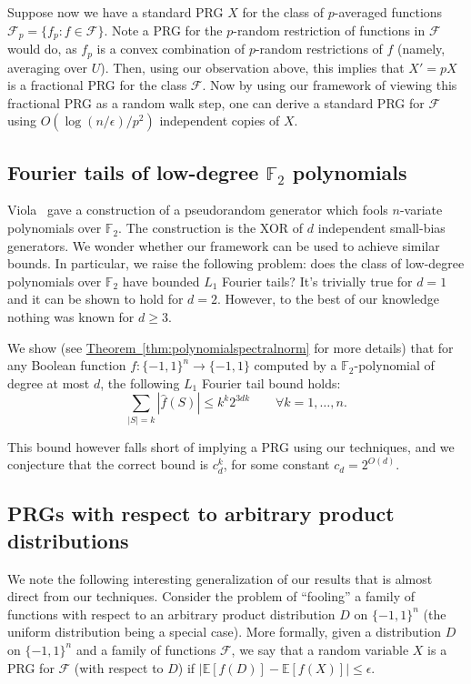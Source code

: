 \documentclass[11pt]{article}
\numberwithin{equation}{section}
\theoremstyle{definition}
\theoremstyle{plain}
\newcommand{\expref}[2]{\hyperref[#2]{#1~\ref{#2}}}
\newcommand{\E}{\mathbb{E}}
\newcommand{\F}{\mathbb{F}}
\newcommand{\FF}{\mathcal{F}}
\begin{document}
Suppose now we have a standard PRG $X$ for the class of $p$-averaged functions $\FF_p = \{f_p : f\in \FF\}$. Note a PRG for the $p$-random restriction of functions in $\FF$ would do,
%
%
as $f_p$ is a convex combination of $p$-random restrictions of $f$ (namely, averaging over $U$). Then, using our observation above,  this implies that $X'=pX$ is a fractional PRG for the class $\FF$. Now by using our framework of viewing this fractional PRG as a random walk step, one can derive a standard PRG for $\FF$ using $O(\log(n/\epsilon)/p^2)$ independent copies of $X$.

\subsection{Fourier tails of low-degree \texorpdfstring{$\F_2$}{F2} polynomials}
Viola~\cite{viola2009sum} gave a construction of a pseudorandom generator which fools $n$-variate polynomials over $\F_2$.
The construction is the XOR of $d$ independent small-bias generators.
We wonder whether our framework can be used to achieve
similar bounds. In particular, we raise the following problem: does the class of low-degree polynomials over $\F_2$ have bounded
$L_1$ Fourier tails? It's trivially true for $d=1$ and it can be shown to hold for $d=2$. However, to the best of our knowledge nothing was known for
 $d \ge 3$.

We show (see \expref{Theorem}{thm:polynomialspectralnorm}  for more details) that for any Boolean function $f: \{ -1,1\}^{n} \rightarrow \{-1,1 \}$ computed by a $\F_2$-polynomial of degree at most $d$, the following $L_1$ Fourier tail bound holds: $$ \sum_{|S|=k} |\widehat{f}(S)| \le k^k 2^{3dk} \qquad \forall k=1,\ldots,n.$$

This bound however falls short of  implying a PRG using our techniques, and we conjecture that the correct bound is $c_{d}^{k}$, for some constant $c_d=2^{O(d)}$.

\subsection{PRGs with respect to arbitrary product distributions} We note the following interesting generalization of our results that  is almost direct from our techniques. Consider the problem of ``fooling'' a family of functions with respect to an arbitrary product distribution $D$ on $\{ -1,1\}^n$ (the uniform distribution being a special case). More formally, given a distribution $D$ on $\{-1,1 \}^n$ and a family of functions $\FF$, we say that a random variable $X$ is a PRG for $\FF$ (with respect to $D$) if $|\E[f(D)]  - \E[f(X)]| \le \epsilon$.
\end{document}
